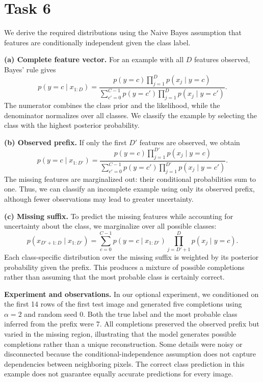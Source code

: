 \documentclass[a4paper,oneside,bibliography=totoc]{scrartcl}
\begin{document}
\section*{Task 6}
\begin{answer}[19cm]
We derive the required distributions using the Naive Bayes assumption that features are conditionally independent given the class label.

\textbf{(a) Complete feature vector.}
For an example with all $D$ features observed, Bayes' rule gives
\[
p(y=c\mid x_{1:D})=
\frac{p(y=c)\prod_{j=1}^{D}p(x_j\mid y=c)}
{\sum_{c'=0}^{C-1}p(y=c')\prod_{j=1}^{D}p(x_j\mid y=c')}.
\]
The numerator combines the class prior and the likelihood, while the denominator normalizes over all classes. We classify the example by selecting the class with the highest posterior probability.

\textbf{(b) Observed prefix.}
If only the first $D'$ features are observed, we obtain
\[
p(y=c\mid x_{1:D'})=
\frac{p(y=c)\prod_{j=1}^{D'}p(x_j\mid y=c)}
{\sum_{c'=0}^{C-1}p(y=c')\prod_{j=1}^{D'}p(x_j\mid y=c')}.
\]
The missing features are marginalized out: their conditional probabilities sum to one. Thus, we can classify an incomplete example using only its observed prefix, although fewer observations may lead to greater uncertainty.

\textbf{(c) Missing suffix.}
To predict the missing features while accounting for uncertainty about the class, we marginalize over all possible classes:
\[
p(x_{D'+1:D}\mid x_{1:D'})=
\sum_{c=0}^{C-1}p(y=c\mid x_{1:D'})
\prod_{j=D'+1}^{D}p(x_j\mid y=c).
\]
Each class-specific distribution over the missing suffix is weighted by its posterior probability given the prefix. This produces a mixture of possible completions rather than assuming that the most probable class is certainly correct.

\textbf{Experiment and observations.}
In our optional experiment, we conditioned on the first 14 rows of the first test image and generated five completions using $\alpha=2$ and random seed $0$. Both the true label and the most probable class inferred from the prefix were 7. All completions preserved the observed prefix but varied in the missing region, illustrating that the model generates possible completions rather than a unique reconstruction. Some details were noisy or disconnected because the conditional-independence assumption does not capture dependencies between neighboring pixels. The correct class prediction in this example does not guarantee equally accurate predictions for every image.
\end{answer}



\newpage

\end{document}
